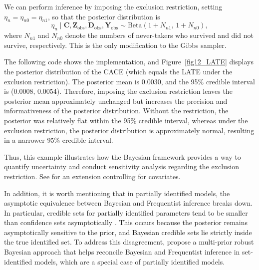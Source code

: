 We can perform inference by imposing the exclusion restriction, setting $\eta_{n} = \eta_{n0} = \eta_{n1}$, so that the posterior distribution is
\[
\eta_{n} \mid \mathbf{C}, \mathbf{Z}_{\text{obs}}, \mathbf{D}_{\text{obs}}, \mathbf{Y}_{\text{obs}} \sim \text{Beta}(1 + N_{n1},\, 1 + N_{n0}),
\]
where $N_{n1}$ and $N_{n0}$ denote the numbers of never-takers who survived and did not survive, respectively. This is the only modification to the Gibbs sampler.  

The following code shows the implementation, and Figure~\ref{fig12_LATE} displays the posterior distribution of the CACE (which equals the LATE under the exclusion restriction). The posterior mean is 0.0030, and the 95\% credible interval is (0.0008, 0.0054). Therefore, imposing the exclusion restriction leaves the posterior mean approximately unchanged but increases the precision and informativeness of the posterior distribution. Without the restriction, the posterior was relatively flat within the 95\% credible interval, whereas under the exclusion restriction, the posterior distribution is approximately normal, resulting in a narrower 95\% credible interval.

Thus, this example illustrates how the Bayesian framework provides a way to quantify uncertainty and conduct sensitivity analysis regarding the exclusion restriction. See \cite{hirano2000assessing} for an extension controlling for covariates. 

In addition, it is worth mentioning that in partially identified models, the asymptotic equivalence between Bayesian and Frequentist inference breaks down. In particular, credible sets for partially identified parameters tend to be smaller than confidence sets asymptotically \cite{MoonSchorfheide2012}. This occurs because the posterior remains asymptotically sensitive to the prior, and Bayesian credible sets lie strictly inside the true identified set. To address this disagreement, \cite{Giacomini2021} propose a multi-prior robust Bayesian approach that helps reconcile Bayesian and Frequentist inference in set-identified models, which are a special case of partially identified models.

